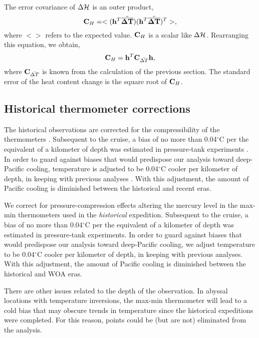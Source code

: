 \documentclass[12pt]{article}
\begin{document}
The error covariance of $\Delta {\cal H}$ is an outer product, 
\begin{equation}
\mbox{{\bf C}}_{H} = <({\bf h}^T \tilde{\overline{{\boldsymbol \Delta}{\bf T}}})({\bf h}^T \tilde{\overline{{\boldsymbol \Delta}{\bf T}}})^T>,
\end{equation}
where $<>$ refers to the expected value. ${\bf C}_H$ is a scalar like $\Delta {\cal H}$.
Rearranging this equation, we obtain, 
\begin{equation}
\mbox{{\bf C}}_{H} =  {\bf h}^T \mbox{{\bf C}}_{{\tilde{\Delta T}}} {\bf h},
\end{equation}
where $\mbox{{\bf C}}_{{\tilde{\Delta T}}}$ is known from the
calculation of the previous section. The standard error of the heat
content change is the square root of $\mbox{{\bf C}}_{H}$.

\subsection{Historical thermometer corrections}

The historical observations are corrected for the
compressibility of the thermometers \cite{Tait--1882:Pressure}.
Subsequent to the cruise, a bias of no more than 0.04$^\circ$C per the
equivalent of a kilometer of depth was estimated in pressure-tank
experiments \cite{Tait--1882:Pressure}. In order to guard against
biases that would predispose our analysis toward deep-Pacific cooling,
temperature is adjusted to be 0.04$^\circ$C cooler per kilometer of
depth, in keeping with previous analyses
\cite{Roemmich-Gould-2012:135}. With this adjustment, the amount of
Pacific cooling is diminished between the historical and recent eras.

We correct for pressure-compression effects altering the mercury level
in the max-min thermometers used in the {\it historical} expedition.
Subsequent to the cruise, a bias of no more than 0.04$^\circ$C per the
equivalent of a kilometer of depth was estimated in pressure-tank
experiments\cite{Tait--1882:Pressure}. In order to guard against
biases that would predispose our analysis toward deep-Pacific cooling,
we adjust temperature to be 0.04$^\circ$C cooler per kilometer of
depth, in keeping with previous
analyses\cite{Roemmich-Gould-2012:135}. With this adjustment, the
amount of Pacific cooling is diminished between the historical and WOA
eras.

There are other issues related to the depth of the observation.  In
abyssal locations with temperature inversions, the max-min thermometer
will lead to a cold bias that may obscure trends in temperature since
the historical expeditions were completed. For this reason, points
could be (but are not) eliminated from the analysis.
\end{document}
